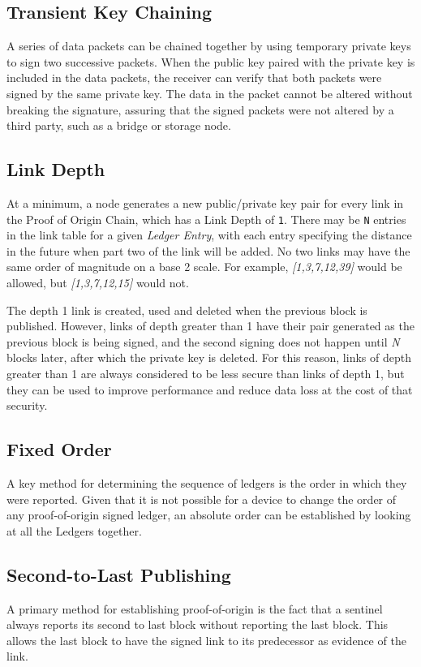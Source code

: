 \documentclass{article}
\begin{document}
\subsection {Transient Key Chaining}
A series of data packets can be chained together by using temporary private keys to sign two successive packets. When the public key paired with the private key is included in the data packets, the receiver can verify that both packets were signed by the same private key. The data in the packet cannot be altered without breaking the signature, assuring that the signed packets were not altered by a third party, such as a \gls{bridge} or storage node.

\subsection {Link Depth}
At a minimum, a node generates a new public/private key pair for every link in the Proof of Origin Chain, which has a Link Depth of \texttt{1}. There may be \texttt{N} entries in the link table for a given \textit{Ledger Entry}, with each entry specifying the distance in the future when part two of the link will be added. No two links may have the same order of magnitude on a base 2 scale. For example, \textit{[1,3,7,12,39]} would be allowed, but \textit{[1,3,7,12,15]} would not.

The depth 1 link is created, used and deleted when the previous block is published. However, links of depth greater than 1 have their pair generated as the previous block is being signed, and the second signing does not happen until \textit{N} blocks later, after which the private key is deleted. For this reason, links of depth greater than 1 are always considered to be less secure than links of depth 1, but they can be used to improve performance and reduce data loss at the cost of that security.

\subsection {Fixed Order}
A key method for determining the sequence of ledgers is the order in which they were reported. Given that it is not possible for a device to change the order of any \Gls{proof-of-origin} signed ledger, an absolute order can be established by looking at all the Ledgers together.

\subsection {Second-to-Last Publishing}
A primary method for establishing \Gls{proof-of-origin} is the fact that a \Gls{sentinel} always reports its second to last block without reporting the last block. This allows the last block to have the signed link to its predecessor as evidence of the link.
\end{document}
